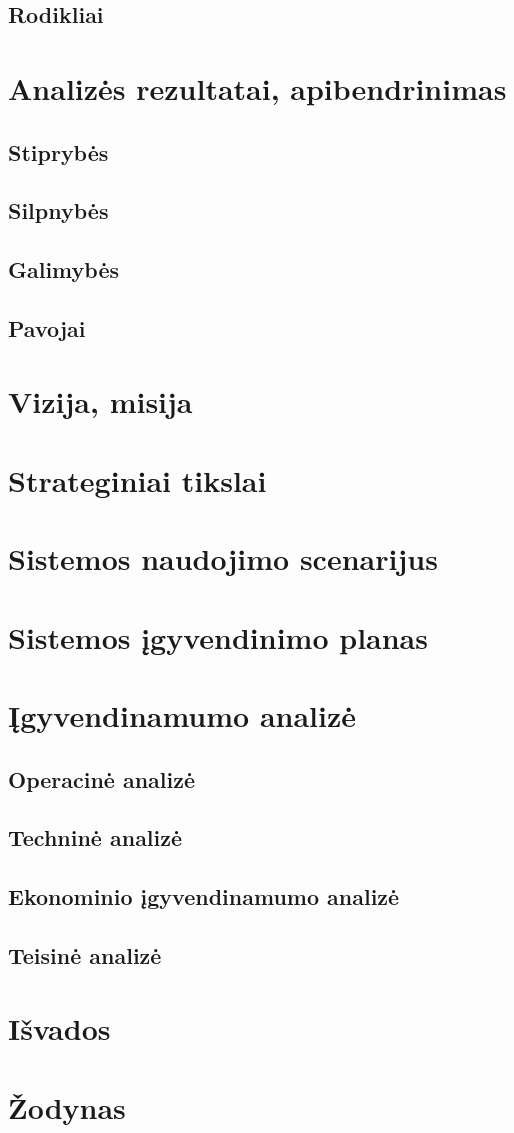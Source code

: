 \documentclass[oneside]{VUMIFPSkursinis}
\begin{document}
	\subsection{Rodikliai}
\section{Analizės rezultatai, apibendrinimas}
	\subsection{Stiprybės}
	\subsection{Silpnybės}
	\subsection{Galimybės}
	\subsection{Pavojai}
\section{Vizija, misija}
\section{Strateginiai tikslai}
\section{Sistemos naudojimo scenarijus}
\section{Sistemos įgyvendinimo planas}
\section{Įgyvendinamumo analizė}
	\subsection{Operacinė analizė}
	\subsection{Techninė analizė}
	\subsection{Ekonominio įgyvendinamumo analizė}
	\subsection{Teisinė analizė}
\section{Išvados}
\section{Žodynas}
\end{document}
